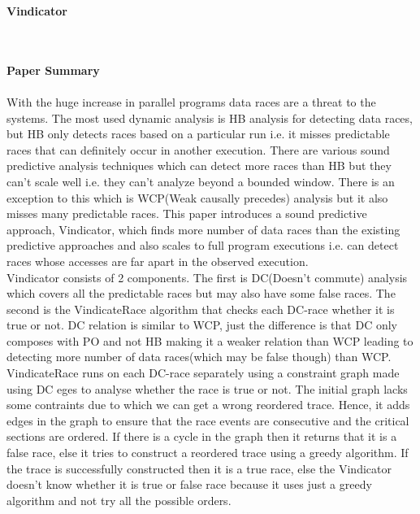 \documentclass[20pt]{letter}
\begin{document}
\begin{enumerate}
{ \Large
\item
\begin{center}
    \textbf{Vindicator}
\end{center}
}
{ \fontsize{13}{17}\selectfont\\

\textbf{\\Paper Summary}\\\\
With the huge increase in parallel programs data races are a threat to the systems. The most used dynamic analysis is HB analysis for detecting data races, but HB only detects races based on a particular run i.e. it misses predictable races that can definitely occur in another execution. There are various sound predictive analysis techniques which can detect more races than HB but they can't scale well i.e. they can't analyze beyond a bounded window. There is an exception to this which is WCP(Weak causally precedes) analysis but it also misses many predictable races. This paper introduces a sound predictive approach, Vindicator, which finds more number of data races than the existing predictive approaches and also scales to full program executions i.e. can detect races whose accesses are far apart in the observed execution.\\

Vindicator consists of 2 components. The first is DC(Doesn't commute) analysis which covers all the predictable races but may also have some false races. The second is the VindicateRace algorithm that checks each DC-race whether it is true or not. DC relation is similar to WCP, just the difference is that DC only composes with PO and not HB making it a weaker relation than WCP leading to detecting more number of data races(which may be false though) than WCP. VindicateRace runs on each DC-race separately using a constraint graph made using DC eges to analyse whether the race is true or not. The initial graph lacks some contraints due to which we can get a wrong reordered trace. Hence, it adds edges in the graph to ensure that the race events are consecutive and the critical sections are ordered. If there is a cycle in the graph then it returns that it is a false race, else it tries to construct a reordered trace using a greedy algorithm. If the trace is successfully constructed then it is a true race, else the Vindicator doesn't know whether it is true or false race because it uses just a greedy algorithm and not try all the possible orders.\\

}
\end{enumerate}
\end{document}
